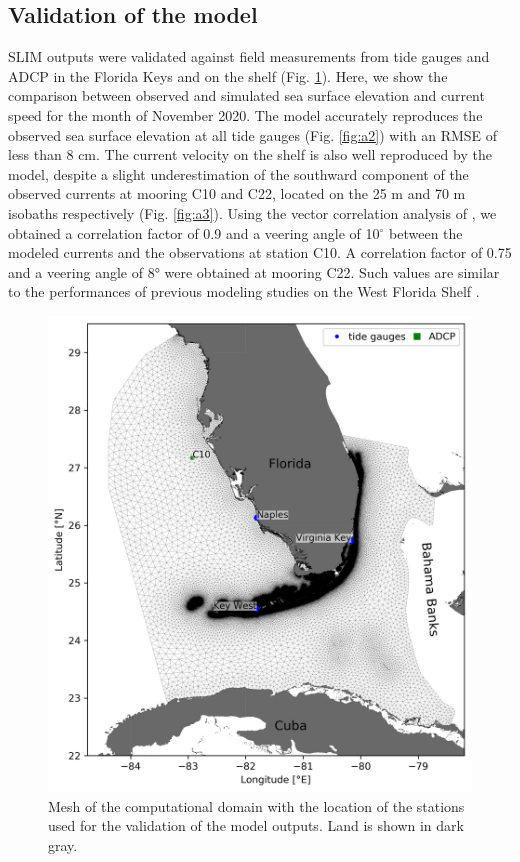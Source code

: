 \begin{subappendices}
	\section{Validation of the model}\label{drto:validation}
	
	SLIM outputs were validated against field measurements from tide gauges and ADCP in the Florida Keys and on the shelf (Fig. \ref{fig:a1}). Here, we show the comparison between observed and simulated sea surface elevation and current speed for the month of November 2020. The model accurately reproduces the observed sea surface elevation at all tide gauges (Fig. \ref{fig:a2}) with an RMSE of less than 8 cm. The current velocity on the shelf is also  well reproduced by the model, despite a slight underestimation of the southward component of the observed currents at mooring C10 and C22, located on the 25 m and 70 m isobaths respectively (Fig. \ref{fig:a3}). Using the vector correlation analysis of \citep{kundu1976ekman}, we obtained a correlation factor of 0.9 and a veering angle of 10$^\circ$ between the modeled currents and the observations at station C10. A correlation factor of 0.75 and a veering angle of 8° were obtained at mooring C22. Such values are similar to the performances of previous modeling studies on the West Florida Shelf \cite{liu2020impacts}.
		
	\begin{figure}
		\centering
		\includegraphics[width=.8\textwidth]{chapters/drto/figures/a1.JPEG}
		\caption{Mesh of the computational domain with the location of the stations used for the validation of the model outputs. Land is shown in dark gray.}
		\label{fig:a1}
	\end{figure}
	

\end{subappendices}
